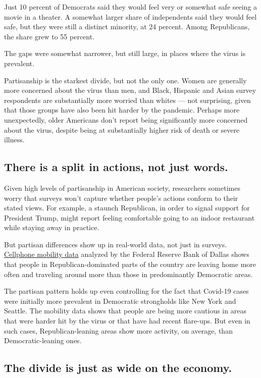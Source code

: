 Just 10 percent of Democrats said they would feel very or somewhat safe
seeing a movie in a theater. A somewhat larger share of independents
said they would feel safe, but they were still a distinct minority, at
24 percent. Among Republicans, the share grew to 55 percent.

The gaps were somewhat narrower, but still large, in places where the
virus is prevalent.

Partisanship is the starkest divide, but not the only one. Women are
generally more concerned about the virus than men, and Black, Hispanic
and Asian survey respondents are substantially more worried than whites
--- not surprising, given that those groups have also been hit harder by
the pandemic. Perhaps more unexpectedly, older Americans don't report
being significantly more concerned about the virus, despite being at
substantially higher risk of death or severe illness.

\hypertarget{there-is-a-split-in-actions-not-just-words}{%
\subsection{There is a split in actions, not just
words.}\label{there-is-a-split-in-actions-not-just-words}}

Given high levels of partisanship in American society, researchers
sometimes worry that surveys won't capture whether people's actions
conform to their stated views. For example, a staunch Republican, in
order to signal support for President Trump, might report feeling
comfortable going to an indoor restaurant while staying away in
practice.

But partisan differences show up in real-world data, not just in
surveys.
\href{https://www.dallasfed.org/research/economics/2020/0521}{Cellphone
mobility data} analyzed by the Federal Reserve Bank of Dallas shows that
people in Republican-dominated parts of the country are leaving home
more often and traveling around more than those in predominantly
Democratic areas.

The partisan pattern holds up even controlling for the fact that
Covid-19 cases were initially more prevalent in Democratic strongholds
like New York and Seattle. The mobility data shows that people are being
more cautious in areas that were harder hit by the virus or that have
had recent flare-ups. But even in such cases, Republican-leaning areas
show more activity, on average, than Democratic-leaning ones.

\hypertarget{the-divide-is-just-as-wide-on-the-economy}{%
\subsection{The divide is just as wide on the
economy.}\label{the-divide-is-just-as-wide-on-the-economy}}

